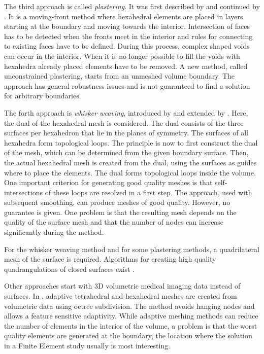 The third approach is called \emph{plastering}. It was first described by \cite{blacker1993seams} and continued by \cite{staten2006unconstrained,staten2010unconstrained}.
It is a moving-front method where hexahedral elements are placed in layers starting at the boundary and moving towards the interior. Intersection of faces has to be detected when the fronts meet in the interior and rules for connecting to existing faces have to be defined.
During this process, complex shaped voids can occur in the interior. When it is no longer possible to fill the voids with hexahedra already placed elements have to be removed.
A new method, called unconstrained plastering, starts from an unmeshed volume boundary. The approach has general robustness issues and is not guaranteed to find a solution for arbitrary boundaries.

The forth approach is \emph{whisker weaving}, introduced by \cite{tautges1996whisker} and extended by \cite{ledoux2008extension,kawamura2008strategy}. Here, the dual of the hexahedral mesh is considered. The dual consists of the three surfaces per hexahedron that lie in the planes of symmetry. The surfaces of all hexahedra form topological loops. 
The principle is now to first construct the dual of the mesh, which can be determined from the given boundary surface. Then, the actual hexahedral mesh is created from the dual, using the surfaces as guides where to place the elements.
The dual forms topological loops inside the volume. One important criterion for generating good quality meshes is that self-intersections of these loops are resolved in a first step.
The approach, used with subsequent smoothing, can produce meshes of good quality. However, no guarantee is given. One problem is that the resulting mesh depends on the quality of the surface mesh and that the number of nodes can increase significantly during the method.

For the whisker weaving method and for some plastering methods, a quadrilateral mesh of the surface is required. Algorithms for creating high quality quadrangulations of closed surfaces exist \cite{dong2005quadrangulating,Kovacs2011Anisotropic,Bessmeltsev2012,Meng2016Consistent}.

Other approaches start with 3D volumetric medical imaging data instead of surfaces. In \cite{Zhang2003,Zhang20053DFiniteElementMeshing}, adaptive tetrahedral and hexahedral meshes are created from volumetric data using octree subdivision. The method avoids hanging nodes and allows a feature sensitive adaptivity. While adaptive meshing methods can reduce the number of elements in the interior of the volume, a problem is that the worst quality elements are generated at the boundary, the location where the solution in a Finite Element study usually is most interesting.

